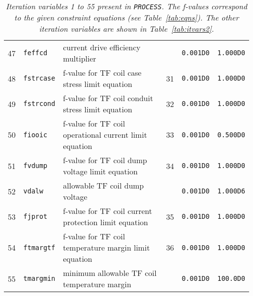 \documentclass[11pt,a4paper]{report}
\newcommand{\process}{\mbox{\texttt{PROCESS}}}
\begin{document}
\begin{table}[tbph]
\begin{center}
\begin{tabular}{||c|l|l|c|c|c||}
47  & \texttt{feffcd}   & current drive efficiency multiplier           &     & \texttt{0.001D0} & \texttt{1.000D0} \\
48  & \texttt{fstrcase} & f-value for TF coil case stress limit equation & 31  & \texttt{0.001D0} & \texttt{1.000D0} \\
49  & \texttt{fstrcond} & f-value for TF coil conduit stress limit equation & 32  & \texttt{0.001D0} & \texttt{1.000D0} \\
50  & \texttt{fiooic}   & f-value for TF coil operational current limit equation & 33  & \texttt{0.001D0} & \texttt{0.500D0} \\
51  & \texttt{fvdump}   & f-value for TF coil dump voltage limit equation         & 34  & \texttt{0.001D0} & \texttt{1.000D0} \\
52  & \texttt{vdalw}    & allowable TF coil dump voltage                          &     & \texttt{0.001D0} & \texttt{1.000D6} \\
53  & \texttt{fjprot}   & f-value for TF coil current protection limit equation   & 35  & \texttt{0.001D0} & \texttt{1.000D0} \\
54  & \texttt{ftmargtf} & f-value for TF coil temperature margin limit equation   & 36  & \texttt{0.001D0} & \texttt{1.000D0} \\
55  & \texttt{tmargmin} & minimum allowable TF coil temperature margin            &     & \texttt{0.001D0} & \texttt{100.0D0} \\
\hline
\end{tabular}
\end{center}
\caption[List of iteration variables 1 to 55]
{\label{tab:itvars1}
  \textit{Iteration variables 1 to 55 present in \process. The f-values correspond to the
    given constraint equations (see Table~\ref{tab:eqns}). The other iteration
    variables are shown in Table~\ref{tab:itvars2}.}
}
\end{table}
\normalsize
\end{document}
